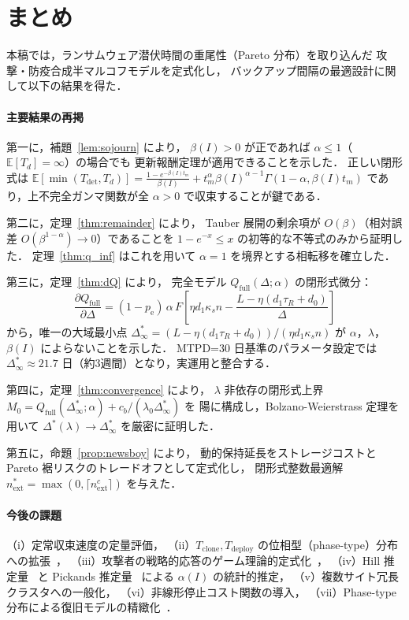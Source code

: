 \documentclass[12pt,a4paper]{article}
\theoremstyle{plain}
\theoremstyle{definition}
\theoremstyle{remark}
\newcommand{\E}{\mathbb{E}}
\newcommand{\pe}{p_{\mathrm{e}}}
\newcommand{\Qf}{Q_{\mathrm{full}}}
\newcommand{\Tdet}{T_{\mathrm{det}}}
\newcommand{\betaI}{\beta(I)}
\newcommand{\alphI}{\alpha(I)}
\newcommand{\Dopt}{\Delta^{*}}
\newcommand{\Dinf}{\Delta^{*}_{\infty}}
\begin{document}
\section{まとめ}
\label{sec:conclusion}

本稿では，ランサムウェア潜伏時間の重尾性（Pareto 分布）を取り込んだ
攻撃・防疫合成半マルコフモデルを定式化し，
バックアップ間隔の最適設計に関して以下の結果を得た．

\paragraph{主要結果の再掲}

第一に，補題~\ref{lem:sojourn} により，
$\betaI>0$ が正であれば $\alpha\le1$（$\E[T_d]=\infty$）の場合でも
更新報酬定理が適用できることを示した．
正しい閉形式は $\E[\min(\Tdet,T_d)]=\tfrac{1-e^{-\betaI t_m}}{\betaI}+t_m^\alpha\betaI^{\alpha-1}\Gamma(1-\alpha,\betaI t_m)$
であり，上不完全ガンマ関数が全 $\alpha>0$ で収束することが鍵である．

第二に，定理~\ref{thm:remainder} により，
Tauber 展開の剰余項が $O(\beta)$（相対誤差 $O(\beta^{1-\alpha})\to0$）であることを
$1-e^{-x}\le x$ の初等的な不等式のみから証明した．
定理~\ref{thm:q_inf} はこれを用いて $\alpha=1$ を境界とする相転移を確立した．

第三に，定理~\ref{thm:dQ} により，
完全モデル $\Qf(\Delta;\alpha)$ の閉形式微分：
\[
\frac{\partial\Qf}{\partial\Delta}
=(1-\pe)\,\alpha\,F\!\left[\eta d_1\kappa_s n-\frac{L-\eta(d_1\tau_R+d_0)}{\Delta}\right]
\]
から，唯一の大域最小点 $\Dinf=(L-\eta(d_1\tau_R+d_0))/(\eta d_1\kappa_s n)$ が
$\alpha$，$\lambda$，$\betaI$ によらないことを示した．
MTPD=30 日基準のパラメータ設定では $\Dinf\approx21.7$ 日（約3週間）となり，実運用と整合する．

第四に，定理~\ref{thm:convergence} により，
$\lambda$ 非依存の閉形式上界 $M_0=\Qf(\Dinf;\alpha)+c_b/(\lambda_0\Dinf)$ を
陽に構成し，Bolzano-Weierstrass 定理を用いて $\Dopt(\lambda)\to\Dinf$ を厳密に証明した．

第五に，命題~\ref{prop:newsboy} により，
動的保持延長をストレージコストと Pareto 裾リスクのトレードオフとして定式化し，
閉形式整数最適解 $n_{\mathrm{ext}}^*=\max(0,\lceil n_{\mathrm{ext}}^c\rceil)$ を与えた．

\paragraph{今後の課題}
（i）定常収束速度の定量評価，
（ii）$T_{\mathrm{clone}},T_{\mathrm{deploy}}$ の位相型（phase-type）分布への拡張~\cite{asmussen2003}，
（iii）攻撃者の戦略的応答のゲーム理論的定式化~\cite{laszka2017}，
（iv）Hill 推定量~\cite{hill1975} と Pickands 推定量~\cite{pickands1975} による $\alphI$ の統計的推定，
（v）複数サイト冗長クラスタへの一般化，
（vi）非線形停止コスト関数の導入，
（vii）Phase-type 分布による復旧モデルの精緻化~\cite{norris1997}．
\end{document}
